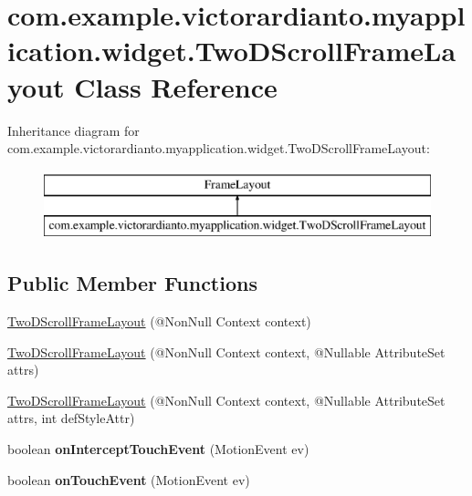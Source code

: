 \hypertarget{classcom_1_1example_1_1victorardianto_1_1myapplication_1_1widget_1_1_two_d_scroll_frame_layout}{}\section{com.\+example.\+victorardianto.\+myapplication.\+widget.\+Two\+D\+Scroll\+Frame\+Layout Class Reference}
\label{classcom_1_1example_1_1victorardianto_1_1myapplication_1_1widget_1_1_two_d_scroll_frame_layout}
Inheritance diagram for com.\+example.\+victorardianto.\+myapplication.\+widget.\+Two\+D\+Scroll\+Frame\+Layout\+:\begin{figure}[H]
\begin{center}
\leavevmode
\includegraphics[height=2.000000cm]{classcom_1_1example_1_1victorardianto_1_1myapplication_1_1widget_1_1_two_d_scroll_frame_layout}
\end{center}
\end{figure}
\subsection*{Public Member Functions}
\begin{DoxyCompactItemize}
\item 
\mbox{\hyperlink{classcom_1_1example_1_1victorardianto_1_1myapplication_1_1widget_1_1_two_d_scroll_frame_layout_a7203f0c9e2344b39fbbd36f169ebeca7}{Two\+D\+Scroll\+Frame\+Layout}} (@Non\+Null Context context)
\item 
\mbox{\hyperlink{classcom_1_1example_1_1victorardianto_1_1myapplication_1_1widget_1_1_two_d_scroll_frame_layout_ae59c58441dd9b1653cd43e4159b700c7}{Two\+D\+Scroll\+Frame\+Layout}} (@Non\+Null Context context, @Nullable Attribute\+Set attrs)
\item 
\mbox{\hyperlink{classcom_1_1example_1_1victorardianto_1_1myapplication_1_1widget_1_1_two_d_scroll_frame_layout_a52b4b0fff06dc926b6cfde22d9e4e1de}{Two\+D\+Scroll\+Frame\+Layout}} (@Non\+Null Context context, @Nullable Attribute\+Set attrs, int def\+Style\+Attr)
\item 
\mbox{\label{classcom_1_1example_1_1victorardianto_1_1myapplication_1_1widget_1_1_two_d_scroll_frame_layout_ac8921e7ddf806fbf3549c1373fe6f519}} 
boolean {\bfseries on\+Intercept\+Touch\+Event} (Motion\+Event ev)
\item 
\mbox{\label{classcom_1_1example_1_1victorardianto_1_1myapplication_1_1widget_1_1_two_d_scroll_frame_layout_a6fdc5fe1d7ee0bc2394c328f8a3fd5c8}} 
boolean {\bfseries on\+Touch\+Event} (Motion\+Event ev)
\end{DoxyCompactItemize}
